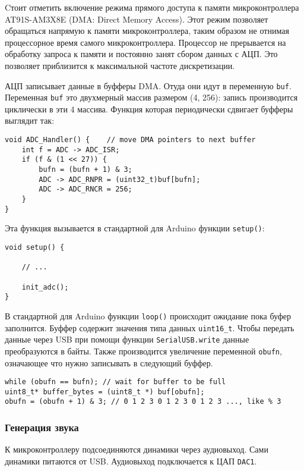 \documentclass[../main.tex]{subfiles}
\begin{document}
Cтоит отметить включение режима прямого доступа к памяти микроконтроллера AT91S-AM3X8E (DMA: Direct Memory Access). Этот режим позволяет обращаться напрямую к памяти микроконтроллера, таким образом не отнимая процессорное время самого микроконтроллера. Процессор не прерывается на обработку запроса к памяти и постоянно занят сбором данных с АЦП. Это позволяет приблизится к максимальной частоте дискретизации.

АЦП записывает данные в буфферы DMA. Отуда они идут в переменную \texttt{buf}. Переменная \texttt{buf} это двухмерный массив размером (4, 256): запись производится циклически в эти 4 массива.
Функция которая периодически сдвигает буфферы выглядит так:

\begin{lstlisting}
void ADC_Handler() {    // move DMA pointers to next buffer
    int f = ADC -> ADC_ISR;
    if (f & (1 << 27)) {
        bufn = (bufn + 1) & 3;
        ADC -> ADC_RNPR = (uint32_t)buf[bufn];
        ADC -> ADC_RNCR = 256;
    }
}
\end{lstlisting}

Эта функция вызывается в стандартной для Arduino функции \texttt{setup()}:


\begin{lstlisting}
void setup() {
    
    // ...
    
    init_adc();
}
\end{lstlisting}



В стандартной для Arduino функции \texttt{loop()} происходит ожидание пока буфер заполнится. Буффер содержит значения типа данных \texttt{uint16\_t}. Чтобы передать данные через USB при помощи функции \texttt{SerialUSB.write} данные преобразуются в байты.
Также производится увеличение переменной \texttt{obufn}, означающее что нужно записывать в следующий буффер.

\begin{lstlisting}
while (obufn == bufn); // wait for buffer to be full
uint8_t* buffer_bytes = (uint8_t *) buf[obufn];
obufn = (obufn + 1) & 3; // 0 1 2 3 0 1 2 3 0 1 2 3 ..., like % 3
\end{lstlisting}


\subsubsection{Генерация звука}

К микроконтроллеру подсоединяются динамики через аудиовыход. Сами динамики питаются от USB. Аудиовыход подключается к ЦАП \texttt{DAC1}.
\end{document}
